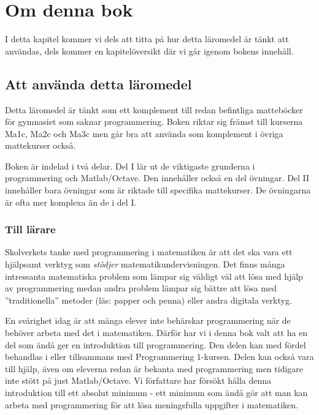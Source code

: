 %
%
\chapter{Om denna bok}\label{ch:ombok}
I detta kapitel kommer vi dels att titta på hur detta läromedel är tänkt att användas, dels kommer en kapitelöversikt där vi går igenom bokens innehåll.

\section{Att använda detta läromedel}
Detta läromedel är tänkt som ett komplement till redan befintliga matteböcker för gymnasiet som saknar programmering. Boken riktar sig främst till kurserna Ma1c, Ma2c och Ma3c men går bra att använda som komplement i övriga mattekurser också.

Boken är indelad i två delar. Del I lär ut de viktigaste grunderna i programmering och Matlab/Octave. Den innehåller också en del övningar. Del II innehåller bara övningar som är riktade till specifika mattekurser. De övningarna är ofta mer komplexa än de i del I.

\subsection{Till lärare}
Skolverkets tanke med programmering i matematiken är att det ska vara ett hjälpsamt verktyg som \emph{stödjer} matematikundervisningen. Det finns många intressanta matematiska problem som lämpar sig väldigt väl att lösa med hjälp av programmering medan andra problem lämpar sig bättre att lösa med ''traditionella'' metoder (läs: papper och penna) eller andra digitala verktyg.

En svårighet idag är att många elever inte behärskar programmering när de behöver arbeta med det i matematiken. Därför har vi i denna bok valt att ha en del som ändå ger en introduktion till programmering. Den delen kan med fördel behandlas i eller tillsammans med Programmering 1-kursen. Delen kan också vara till hjälp, även om eleverna redan är bekanta med programmering men tidigare inte stött på just Matlab/Octave. Vi författare har försökt hålla denna introduktion till ett absolut minimum - ett minimum som ändå gör att man kan arbeta med programmering för att lösa meningsfulla uppgifter i matematiken.

